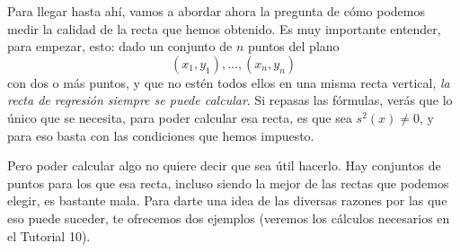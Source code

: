 Para llegar hasta ahí, vamos a abordar ahora la pregunta de cómo podemos medir la calidad de la recta que hemos obtenido. Es muy importante entender, para empezar,  esto: dado un conjunto de $n$ puntos del plano
\[(x_1,y_1),\ldots,(x_n,y_n)\]
con dos o más puntos, y que no estén todos ellos en una misma recta vertical, {\em la recta de regresión siempre se puede calcular}. Si repasas las fórmulas, verás que lo único que se necesita, para poder calcular esa recta, es que sea $s^2(x)\neq 0$, y para eso basta con las condiciones que hemos impuesto.

Pero poder calcular algo no quiere decir que sea útil hacerlo. Hay conjuntos de puntos para los que esa recta, incluso siendo la mejor de las rectas que podemos elegir, es bastante mala. Para darte una idea de las diversas razones por las que eso puede suceder, te ofrecemos dos ejemplos (veremos los cálculos necesarios en el Tutorial 10).

